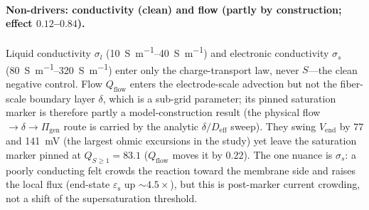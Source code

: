 \documentclass[11pt]{article}
\newcommand{\epss}{\varepsilon_{\mathrm{s}}}
\newcommand{\Deff}{D_{\mathrm{eff}}}
\begin{document}
\paragraph{Non-drivers: conductivity (clean) and flow (partly by construction; effect $0.12$--$0.84$).}
Liquid conductivity $\sigma_l$
(\SIrange{10}{40}{\siemens\per\meter}) and electronic conductivity $\sigma_s$
(\SIrange{80}{320}{\siemens\per\meter}) enter only the charge-transport law, never
$S$---the clean negative control. Flow $Q_{\mathrm{flow}}$ enters the electrode-scale advection but not the
fiber-scale boundary layer $\delta$, which is a sub-grid parameter; its pinned saturation marker is therefore partly a
model-construction result (the physical flow$\to\delta\to\Pi_{\mathrm{gen}}$ route is carried by the analytic
$\delta/\Deff$ sweep). They swing $V_{\mathrm{end}}$ by $77$ and \SI{141}{mV} (the largest ohmic excursions in
the study) yet leave the saturation marker pinned at $Q_{S\ge1}=83.1$ ($Q_{\mathrm{flow}}$ moves it by $0.22$). The one nuance is $\sigma_s$:
a poorly conducting felt crowds the reaction toward the membrane side and raises the local  flux
(end-state $\epss$ up $\sim\!4.5\times$), but this is post-marker current crowding, not a shift of the
supersaturation threshold.
\end{document}
